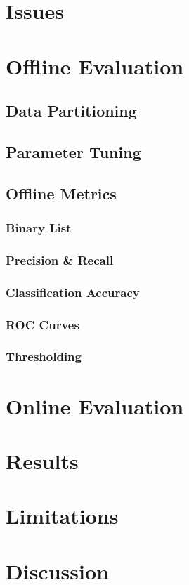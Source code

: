 \section{Issues}

\section{Offline Evaluation}

\subsection{Data Partitioning}

\subsection{Parameter Tuning}

\subsection{Offline Metrics}

\subsubsection{Binary List}

\subsubsection{Precision \& Recall}

\subsubsection{Classification Accuracy}

\subsubsection{ROC Curves}

\subsubsection{Thresholding}

\section{Online Evaluation}

\section{Results}

\section{Limitations}

\section{Discussion}


